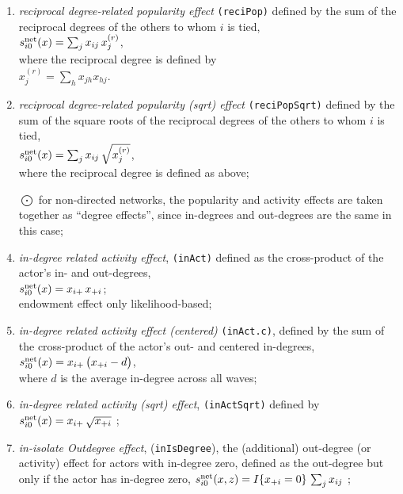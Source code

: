 \documentclass[a4paper,fleqn,11pt]{article}
\newcommand{\+}{\, + \,}
\newcommand{\vit}{\theenumi}
\begin{document}
\begin{enumerate}
 \item {\em reciprocal degree-related popularity effect} \texttt{(reciPop)}
 defined by the sum of the reciprocal degrees
 of the others to whom $i$ is tied,\\
 $s^{\rm net}_{i\vit}(x) =  \sum_j x_{ij}\, x^{(r)}_{j} $, \\
 where the reciprocal degree is defined by\\
 $ x^{(r)}_{j} = \sum_h x_{jh}x_{hj} $.

 \item {\em reciprocal degree-related popularity (sqrt) effect } \texttt{(reciPopSqrt)}
 defined by the sum of the square roots of the reciprocal degrees
 of the others to whom $i$ is tied,\\
 $s^{\rm net}_{i\vit}(x) =  \sum_j x_{ij}\, \sqrt{x^{(r)}_{j}} $, \\
 where the reciprocal degree is defined as above;

 \item[{\hspace*{-1ex}$\bigodot$}] for non-directed networks, the popularity and activity
 effects are taken together as ``degree effects'',
 since in-degrees and out-degrees are the same in this case;

 \item {\em in-degree related activity effect}, \texttt{(inAct)}
 defined as  the cross-product  of the actor's in- and out-degrees,\\
 $s^{\rm net}_{i\vit}(x) = x_{i+}\, x_{+i}$;\\
 endowment effect only likelihood-based;

 \item {\em in-degree related activity effect (centered)} \texttt{(inAct.c)},
 defined by the sum of
 the cross-product of the actor's out- and centered in-degrees,\\
 $s^{\rm net}_{i\vit}(x) =  x_{i+}\,\big( x_{+i} - d \big)$,\\
 where $d$ is the average in-degree across all waves;

 \item {\em in-degree related activity (sqrt) effect}, \texttt{(inActSqrt)}
 defined by  \\
 $s^{\rm net}_{i\vit}(x) = x_{i+}\,\sqrt{x_{+i}}$ ;

\item \emph{in-isolate Outdegree effect}, (\texttt{inIsDegree}), the
      (additional) out-degree (or activity)
      effect for actors with in-degree zero, defined as the out-degree
      but only if the actor has in-degree zero,
 $s^{\rm net}_{i\vit}(x, z) =   I\{x_{+i} = 0 \}\, \sum_j x_{ij}   $ ;\\


\end{enumerate}
\end{document}
